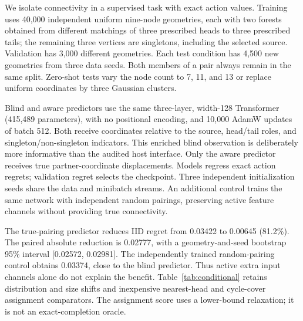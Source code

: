 We isolate connectivity in a supervised task with exact action values.
Training uses 40,000 independent uniform nine-node geometries, each with two
forests obtained from different matchings of three prescribed heads to three
prescribed tails; the remaining three vertices are singletons, including the
selected source. Validation has 3,000 different geometries. Each test condition
has 4,500 new geometries from three data seeds. Both members of a pair always
remain in the same split. Zero-shot tests vary the node count to 7, 11, and 13
or replace uniform coordinates by three Gaussian clusters.

Blind and aware predictors use the same three-layer, width-128 Transformer
(415,489 parameters), with no positional encoding, and 10,000 AdamW updates
of batch 512. Both receive coordinates relative to the source, head/tail
roles, and singleton/non-singleton indicators. This enriched blind observation
is deliberately more informative than the audited host interface. Only the
aware predictor receives true partner-coordinate displacements. Models
regress exact action regrets; validation regret selects the checkpoint.
Three independent initialization seeds share the data and minibatch streams.
An additional control trains the same network with independent random
pairings, preserving active feature channels without providing true connectivity.

\begin{table}[t]
\centering\small

\caption{Exact fixed-source completion regret, averaged over three training
seeds and paired states. This is not complete-tour solver performance.
The random-pairing control and assignment-relaxation heuristic are supplementary
controls designed after pilot validation. All final selection uses validation.
Every condition has 4,500 independent test geometries.}
\label{tab:conditional}
\end{table}

The true-pairing predictor reduces IID regret from 0.03422 to 0.00645
(81.2\%). The paired absolute reduction is 0.02777, with a geometry-and-seed
bootstrap 95\% interval [0.02572, 0.02981]. The independently trained random-pairing
control obtains 0.03374, close to the blind predictor. Thus active extra input
channels alone do not explain the benefit. Table~\ref{tab:conditional} retains
distribution and size shifts and inexpensive nearest-head and cycle-cover
assignment comparators. The assignment score uses a lower-bound relaxation;
it is not an exact-completion oracle.

